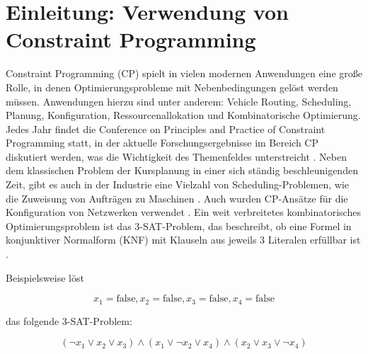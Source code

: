 





\tableofcontents

\clearpage
{}


\section{Einleitung: Verwendung von Constraint Programming}
\label{sec:Einleitung-Verwendung-von-Constraint-Programming}

Constraint Programming (CP) spielt in vielen modernen Anwendungen eine große
Rolle, in denen Optimierungsprobleme mit Nebenbedingungen gelöst werden müssen.
Anwendungen hierzu sind unter anderem: Vehicle Routing, Scheduling, Planung,
Konfiguration, Ressourcenallokation und Kombinatorische Optimierung. Jedes Jahr
findet die Conference on Principles and Practice of Constraint Programming
statt, in der aktuelle Forschungsergebnisse im Bereich CP diskutiert werden, was
die Wichtigkeit des Themenfeldes unterstreicht \cite{CP20we}. Neben dem
klassischen Problem der Kursplanung \cite{duboi96jo} in einer sich ständig
beschleunigenden Zeit, gibt es auch in der Industrie eine Vielzahl von
Scheduling-Problemen, wie die Zuweisung von Aufträgen zu Maschinen
\cite{gedik16jo}. Auch wurden CP-Ansätze für die Konfiguration von Netzwerken
verwendet \cite{ardisjo}. Ein weit verbreitetes kombinatorisches
Optimierungsproblem ist das 3-SAT-Problem, das beschreibt, ob eine Formel in
konjunktiver Normalform (KNF) mit Klauseln aus jeweils 3 Literalen erfüllbar ist
\cite[271]{rossi06bo}. 

Beispielsweise löst

\[ x_1=\text{false}, x_2=\text{false}, x_3=\text{false}, x_4=\text{false} \]

das folgende 3-SAT-Problem:

\[ (\lnot x_1 \lor x_2 \lor x_3) \land (x_1 \lor \lnot x_2 \lor x_4) \land (x_2
\lor x_3 \lor \lnot x_4) \]

